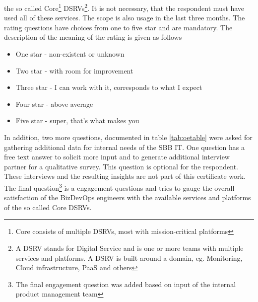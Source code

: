 \documentclass[a4paper,12pt]{article}
\begin{document}
    the so called Core\footnote{Core consists of multiple DSRVs, most with mission-critical platforms} DSRVs\footnote{
        A DSRV stands for Digital Service and is one or more teams with multiple services and platforms. A DSRV is built
        around a domain, eg. Monitoring,        Cloud infrastructure, PaaS and others}.
    It is not necessary, that the respondent must have used all of these services.
    The scope is also usage in the last three months.
    The rating questions have choices from one to five star and are mandatory.
    The description of the meaning of the rating is given as follows
    \begin{itemize}
        \item One star - non-existent or unknown
        \item Two star - with room for improvement
        \item Three star - I can work with it, corresponds to what I expect
        \item Four star - above average
        \item Five star - super, that's what makes you
    \end{itemize}

    In addition, two more questions, documented in table \ref{tab:oetable} were asked for gathering additional data for
    internal needs of the SBB IT.
    One question has a free text answer to solicit more input and to generate additional interview partner
    for a qualitative survey.
    This question is optional for the respondent.
    These interviews and the resulting insights are not part of this certificate work.
    The final question\footnote{The final engagement question was added based on input of the internal product management team}
    is a engagement questions and tries to gauge the overall satisfaction of the BizDevOps engineers
    with the available services and platforms of the so called Core DSRVs.
\end{document}
